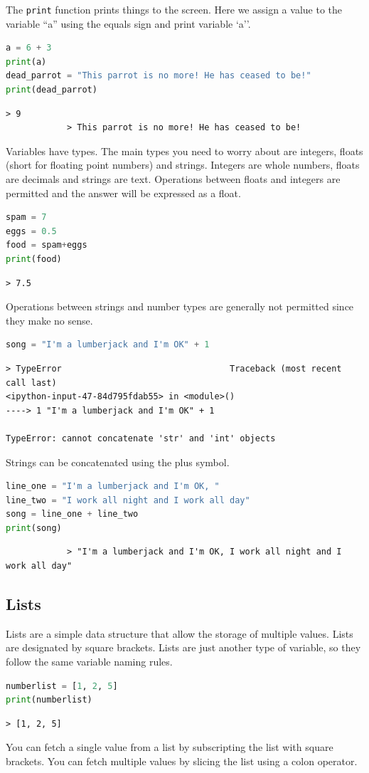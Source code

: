 The \texttt{print} function prints things to the screen. Here we assign a value to the variable ``a'' using the equals sign and print variable `a''.
		\begin{lstlisting}[language=Python]
a = 6 + 3
print(a)
dead_parrot = "This parrot is no more! He has ceased to be!"
print(dead_parrot)\end{lstlisting}
		\begin{verbatim}> 9
			> This parrot is no more! He has ceased to be!
		\end{verbatim}
		Variables have types. The main types you need to worry about are integers, floats (short for floating point numbers) and strings. Integers are whole numbers, floats are decimals and strings are text. Operations between floats and integers are permitted and the answer will be expressed as a float.
		\begin{lstlisting}[language=Python]
spam = 7
eggs = 0.5
food = spam+eggs
print(food)
\end{lstlisting}
		\begin{verbatim}> 7.5\end{verbatim}	
		Operations between strings and number types are generally not permitted since they make no sense.
		\begin{lstlisting}[language=Python]
song = "I'm a lumberjack and I'm OK" + 1\end{lstlisting}
		\begin{verbatim}> TypeError                                 Traceback (most recent call last)
<ipython-input-47-84d795fdab55> in <module>()
----> 1 "I'm a lumberjack and I'm OK" + 1

TypeError: cannot concatenate 'str' and 'int' objects\end{verbatim}

Strings can be concatenated using the plus symbol.	
		\begin{lstlisting}[language=Python]
line_one = "I'm a lumberjack and I'm OK, "
line_two = "I work all night and I work all day"
song = line_one + line_two
print(song)\end{lstlisting}
		\begin{verbatim}
			> "I'm a lumberjack and I'm OK, I work all night and I work all day"
		\end{verbatim}

	\subsection{Lists}
	Lists are a simple data structure that allow the storage of multiple values. Lists are designated by square brackets. Lists are just another type of variable, so they follow the same variable naming rules.
		\begin{lstlisting}[language=Python]
numberlist = [1, 2, 5]
print(numberlist)\end{lstlisting}
		\begin{verbatim}> [1, 2, 5]\end{verbatim}
		You can fetch a single value from a list by subscripting the list with square brackets. You can fetch multiple values by slicing the list using a colon operator.
		
